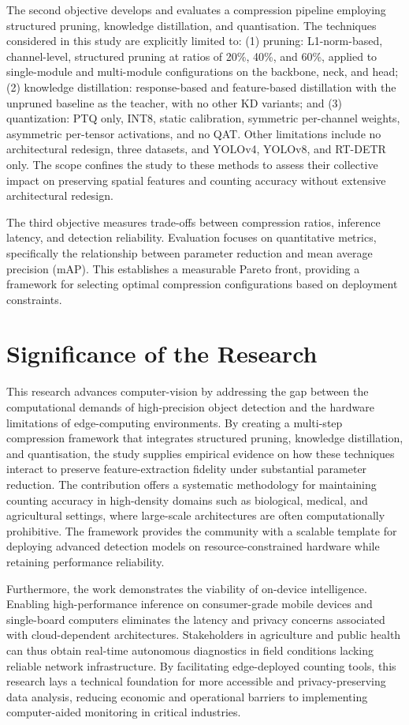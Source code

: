The second objective develops and evaluates a compression pipeline employing structured pruning, knowledge distillation, and quantisation. The techniques considered in this study are explicitly limited to: (1) pruning: L1-norm-based, channel-level, structured pruning at ratios of 20\%, 40\%, and 60\%, applied to single-module and multi-module configurations on the backbone, neck, and head; (2) knowledge distillation: response-based and feature-based distillation with the unpruned baseline as the teacher, with no other KD variants; and (3) quantization: PTQ only, INT8, static calibration, symmetric per-channel weights, asymmetric per-tensor activations, and no QAT. Other limitations include no architectural redesign, three datasets, and YOLOv4, YOLOv8, and RT-DETR only. The scope confines the study to these methods to assess their collective impact on preserving spatial features and counting accuracy without extensive architectural redesign.

The third objective measures trade-offs between compression ratios, inference latency, and detection reliability. Evaluation focuses on quantitative metrics, specifically the relationship between parameter reduction and mean average precision (mAP). This establishes a measurable Pareto front, providing a framework for selecting optimal compression configurations based on deployment constraints.

\section{Significance of the Research}
\label{sec:significance}

This research advances computer-vision by addressing the gap between the computational demands of high-precision object detection and the hardware limitations of edge-computing environments. By creating a multi-step compression framework that integrates structured pruning, knowledge distillation, and quantisation, the study supplies empirical evidence on how these techniques interact to preserve feature-extraction fidelity under substantial parameter reduction. The contribution offers a systematic methodology for maintaining counting accuracy in high-density domains such as biological, medical, and agricultural settings, where large-scale architectures are often computationally prohibitive. The framework provides the community with a scalable template for deploying advanced detection models on resource-constrained hardware while retaining performance reliability.

Furthermore, the work demonstrates the viability of on-device intelligence. Enabling high-performance inference on consumer-grade mobile devices and single-board computers eliminates the latency and privacy concerns associated with cloud-dependent architectures. Stakeholders in agriculture and public health can thus obtain real-time autonomous diagnostics in field conditions lacking reliable network infrastructure. By facilitating edge-deployed counting tools, this research lays a technical foundation for more accessible and privacy-preserving data analysis, reducing economic and operational barriers to implementing computer-aided monitoring in critical industries.



